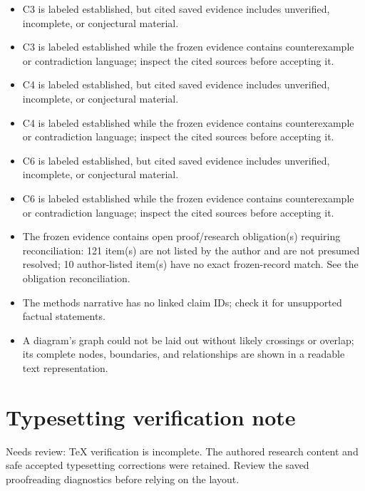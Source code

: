 \documentclass[11pt]{article}
\begin{document}
\begin{itemize}
\item C3 is labeled established, but cited saved evidence includes unverified, incomplete, or conjectural material.
\item C3 is labeled established while the frozen evidence contains counterexample or contradiction language; inspect the cited sources before accepting it.
\item C4 is labeled established, but cited saved evidence includes unverified, incomplete, or conjectural material.
\item C4 is labeled established while the frozen evidence contains counterexample or contradiction language; inspect the cited sources before accepting it.
\item C6 is labeled established, but cited saved evidence includes unverified, incomplete, or conjectural material.
\item C6 is labeled established while the frozen evidence contains counterexample or contradiction language; inspect the cited sources before accepting it.
\item The frozen evidence contains open proof/research obligation(s) requiring reconciliation: 121 item(s) are not listed by the author and are not presumed resolved; 10 author-listed item(s) have no exact frozen-record match. See the obligation reconciliation.
\item The methods narrative has no linked claim IDs; check it for unsupported factual statements.
\item A diagram's graph could not be laid out without likely crossings or overlap; its complete nodes, boundaries, and relationships are shown in a readable text representation.
\end{itemize}
\section*{Typesetting verification note}
Needs review: TeX verification is incomplete. The authored research content and safe accepted typesetting corrections were retained. Review the saved proofreading diagnostics before relying on the layout.
\end{document}
